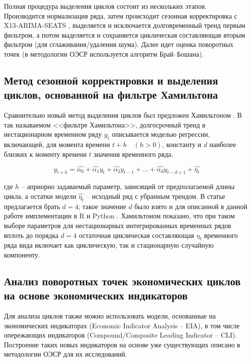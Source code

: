 \documentclass[../report.tex]{subfiles}
\begin{document}
	Полная процедура выделения циклов состоит из нескольких этапов. Производится нормализация ряда, затем происходит сезонная корректировка с X13-ARIMA-SEATS \cite{seasonalManual}, выделяется и исключается долговременный тренд первым фильтром, а потом выделяется и сохраняется циклическая составляющая вторым фильтром (для сглаживания/удаления шума). Далее идет оценка поворотных точек (в методологии ОЭСР \cite{oecdCycleExtraction} используется алгоритм Брай–Бошана).
	
	\subsection{Метод сезонной корректировки и выделения циклов, основанной на фильтре Хамильтона}
	
	Сравнительно новый метод выделения циклов был предложен Хамильтоном \cite{hamNewApproach}. В так называемом <<фильтре Хамильтона>>, долгосрочный тренд в нестационарном временном ряду $y_t$  описывается моделью регрессии, включающей, для момента времени  $t+h \quad (h>0)$, константу и $d$ наиболее близких к моменту времени $t$ значения временного ряда:
	
	\begin{equation}
	y_{t+h} = \hat{\alpha_{0}} + \hat{\alpha_{1}}y_{t} + \hat{\alpha_{2}}y_{t-1}
	+ ... + \hat{\alpha_{d}}y_{t-d+1} + \hat{\eta_{t}}
	\end{equation}
	
	где $h$ – априорно задаваемый параметр, зависящий от предполагаемой длины цикла, а остатки модели $\hat{\eta_{t}}$ – исходный ряд с убранным трендом. В статье предлагается брать $d=4$; такое значение $d$ было взято и для описанной в данной работе имплементации в R и Python \cite{makarevich_bsu_conf_2017}. Хамильтоном показано, что при таком выборе параметров для нестационарных интегрированных временных рядов вплоть до порядка $d=4$ остаточная циклическая составляющая $\eta_{t}$ временного ряда вида включает как циклическую, так и стационарную случайную компоненту. 
	
	
	\subsection{Анализ поворотных точек экономических циклов на основе экономических индикаторов}
	
	Для анализа циклов также можно использовать модели, основанные на экономических индикаторах (Economic Indicator Analysis – EIA), в том числе опережающих индикаторов (Compound/Composite Leading Indicator – CLI). Построение таких новых индикаторов на основе уже существующих описано в методологии ОЭСР \cite{oecdCLI} для их исследований. 
	
\end{document}
